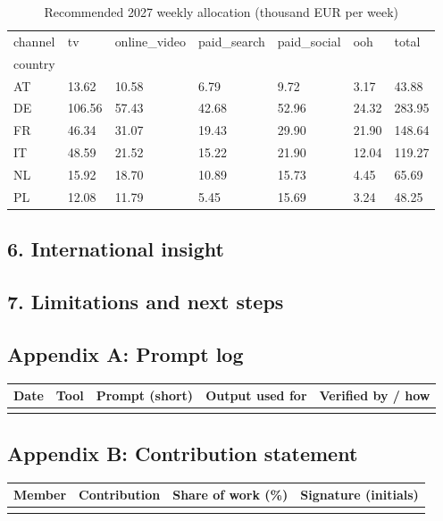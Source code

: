 \documentclass[
  letterpaper,
  DIV=11,
  numbers=noendperiod]{scrartcl}
\begin{document}
\begin{longtable}[]{@{}lllllll@{}}

\caption{\label{tbl-allocation}Recommended 2027 weekly allocation
(thousand EUR per week)}

\tabularnewline

\toprule\noalign{}
channel & tv & online\_video & paid\_search & paid\_social & ooh &
total \\
country & & & & & & \\
\midrule\noalign{}
\endhead
\bottomrule\noalign{}
\endlastfoot
AT & 13.62 & 10.58 & 6.79 & 9.72 & 3.17 & 43.88 \\
DE & 106.56 & 57.43 & 42.68 & 52.96 & 24.32 & 283.95 \\
FR & 46.34 & 31.07 & 19.43 & 29.90 & 21.90 & 148.64 \\
IT & 48.59 & 21.52 & 15.22 & 21.90 & 12.04 & 119.27 \\
NL & 15.92 & 18.70 & 10.89 & 15.73 & 4.45 & 65.69 \\
PL & 12.08 & 11.79 & 5.45 & 15.69 & 3.24 & 48.25 \\

\end{longtable}

\subsection{6. International insight}\label{international-insight}

\subsection{7. Limitations and next
steps}\label{limitations-and-next-steps}

\subsection*{Appendix A: Prompt log}\label{appendix-a-prompt-log}

\begin{longtable}[]{@{}lllll@{}}
\toprule\noalign{}
Date & Tool & Prompt (short) & Output used for & Verified by / how \\
\midrule\noalign{}
\endhead
\bottomrule\noalign{}
\endlastfoot
& & & & \\
\end{longtable}

\subsection*{Appendix B: Contribution
statement}\label{appendix-b-contribution-statement}

\begin{longtable}[]{@{}llll@{}}
\toprule\noalign{}
Member & Contribution & Share of work (\%) & Signature (initials) \\
\midrule\noalign{}
\endhead
\bottomrule\noalign{}
\endlastfoot
& & & \\
\end{longtable}
\end{document}

